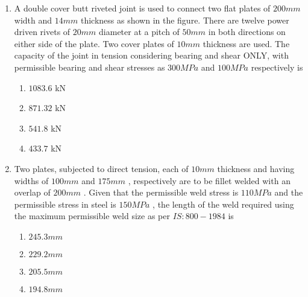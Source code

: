 \documentclass[journal]{IEEEtran}
\begin{document}
\begin{enumerate}
	\item A double cover butt riveted joint is used to connect two flat plates of $200 mm$ width and $14 mm$ thickness as shown in the figure. There are twelve power driven rivets of $20 mm$ diameter at a pitch of $50 mm$ in both directions on either side of the plate. Two cover plates of $10 mm$ thickness are used. The capacity of the joint in tension considering bearing and shear ONLY, with permissible bearing and shear stresses as $300 MPa$ and $100 MPa$ respectively is
		
		\begin{enumerate}
			\item $1083.6$ kN
			\item $871.32$ kN
			\item $541.8$ kN
			\item $433.7$ kN
        	\end{enumerate}
	\item Two plates, subjected to direct tension, each of $10 mm$ thickness and having widths of $100 mm$ and $175 mm$ , respectively are to be fillet welded with an overlap of $200 mm$ . Given that the permissible weld stress is $110 MPa$ and the permissible stress in steel is $150 MPa$ , the length of the weld required using the maximum permissible weld size as per $IS:800-1984$ is
		\begin{center}
   	
		\end{center}
		\newpage
		\begin{enumerate}
		       \item $245.3 mm$
		       \item $229.2 mm$
		       \item $205.5 mm$
		       \item $194.8 mm$
        	\end{enumerate}	
	


\end{enumerate}
\end{document}

